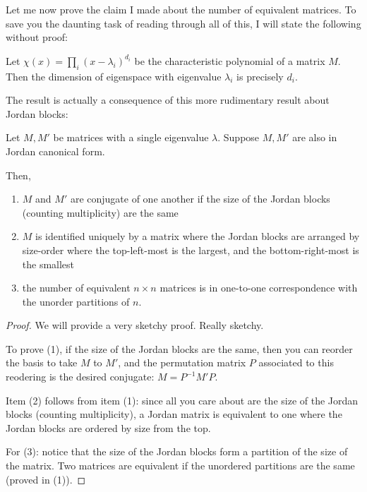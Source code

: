 Let me now prove the claim I made about the number of equivalent
matrices. To save you the daunting task of reading through all of
this, I will state the following without proof:

\begin{lem}
Let $\chi(x) = \prod_i (x - \lambda_i)^{d_i}$ be the characteristic
polynomial of a matrix $M$. Then the dimension of eigenspace with
eigenvalue $\lambda_i$ is precisely $d_i$.
\end{lem}

The result is actually a consequence of this more rudimentary
result about Jordan blocks:

\begin{prop}
Let $M, M'$ be matrices with a single eigenvalue $\lambda$. 
Suppose $M, M'$ are also in Jordan canonical form.

Then, 
\begin{enumerate}
\item $M$ and $M'$ are conjugate of one another if the size of
the Jordan blocks (counting multiplicity) are the same

\item $M$ is identified uniquely by a matrix where the Jordan
blocks are arranged by size-order where the top-left-most is
the largest, and the bottom-right-most is the smallest

\item the number of equivalent $n \times n$ matrices is in
one-to-one correspondence with the unorder partitions of $n$.
\end{enumerate}
\end{prop}

\begin{proof}
We will provide a very sketchy proof. Really sketchy.

To prove (1), if the size of the Jordan blocks are the same,
then you can reorder the basis to take $M$ to $M'$, and the 
permutation matrix $P$ associated to this reodering is the desired 
conjugate: $M = P^{-1}M'P$.

Item (2) follows from item (1): since all you care about are
the size of the Jordan blocks (counting multiplicity), a Jordan
matrix is equivalent to one where the Jordan blocks are ordered
by size from the top.

For (3): notice that the size of the Jordan blocks form a
partition of the size of the matrix. Two matrices are equivalent
if the unordered partitions are the same (proved in (1)).
\end{proof}

